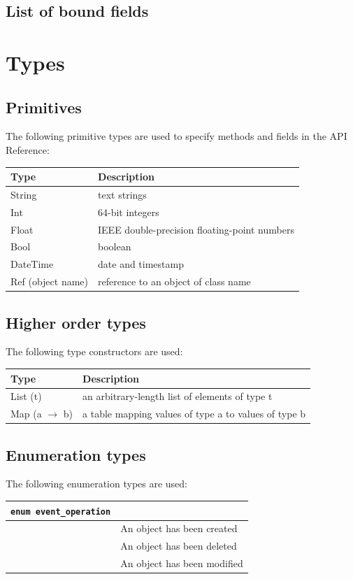 \subsection{List of bound fields}
\section{Types}
\subsection{Primitives}
The following primitive types are used to specify methods and fields in the API Reference:

\begin{center}\begin{tabular}{|ll|}
\hline
Type & Description \\
\hline
String & text strings \\
Int    & 64-bit integers \\
Float & IEEE double-precision floating-point numbers \\
Bool   & boolean \\
DateTime & date and timestamp \\
Ref (object name) & reference to an object of class name \\
\hline
\end{tabular}\end{center}
\subsection{Higher order types}
The following type constructors are used:

\begin{center}\begin{tabular}{|ll|}
\hline
Type & Description \\
\hline
List (t) & an arbitrary-length list of elements of type t \\
Map (a $\rightarrow$ b) & a table mapping values of type a to values of type b \\
\hline
\end{tabular}\end{center}
\subsection{Enumeration types}
The following enumeration types are used:

\begin{longtable}{|ll|}
\hline
{\tt enum event\_operation} & \\
\hline
\hspace{0.5cm}{\tt add} & An object has been created \\
\hspace{0.5cm}{\tt del} & An object has been deleted \\
\hspace{0.5cm}{\tt mod} & An object has been modified \\
\hline
\end{longtable}

